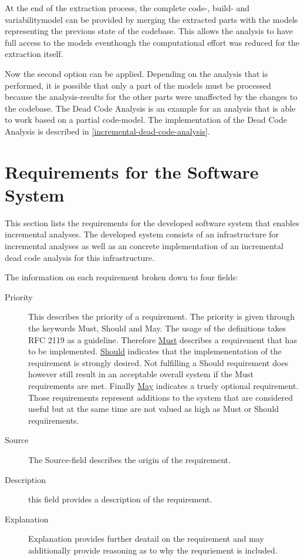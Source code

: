 \documentclass[a4paper]{article}
\begin{document}
At the end of the extraction process, the complete code-, build- and variabilitymodel can be provided by merging the extracted parts with the models representing the previous state of the codebase. This allows the analysis to have full access to the models eventhough the computational effort was reduced for the extraction itself.

Now the second option can be applied. Depending on the analysis that is performed, it is possible that only a part of the models must be processed because the analysis-results for the other parts were unaffected by the changes to the codebase. The Dead Code Analysis is an example for an analysis that is able to work based on a partial code-model. The implementation of the Dead Code Analysis is described in \autoref{incremental-dead-code-analysis}.


\clearpage
\section{Requirements for the Software System}

This section lists the requirements for the developed software system that enables incremental analyses. The developed system consists of an infrastructure for incremental analyses as well as an concrete implementation of an incremental dead code analysis for this infrastructure.

The information on each requirement broken down to four fields:

\begin{description}
    \item [Priority]
	This describes the priority of a requirement. The priority is given through the keywords Must, Should and May. The usage of the definitions takes RFC 2119 \cite{RFC-bum} as a guideline. Therefore \underline{Must} describes a requirement that has to be implemented. \underline{Should} indicates that the implemenentation of the requirement is strongly desired. Not fulfilling a Should requirement  does however still result in an acceptable overall system if the Must requirements are met. Finally \underline{May} indicates a truely optional requirement. Those requirements represent additions to the system that are considered useful but at the same time are not valued as high as Must or Should requiirements.
    \item [Source]
    The Source-field describes the origin of the requirement.
    \item [Description]
    this field provides a description of the requirement.
    \item [Explanation]
    Explanation provides further deatail on the requirement and may additionally provide reasoning as to why the requriement is included.
\end{description}
\end{document}
